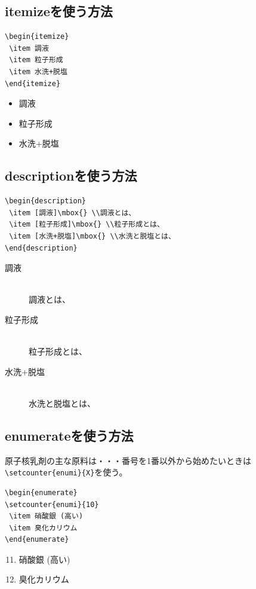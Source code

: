 \documentclass[a4j]{jsarticle}
\begin{document}
\subsection{itemizeを使う方法}
\begin{verbatim}
\begin{itemize}
 \item 調液
 \item 粒子形成
 \item 水洗+脱塩
\end{itemize}
\end{verbatim}

\begin{itemize}
 \item 調液
 \item 粒子形成
 \item 水洗+脱塩
\end{itemize}
\subsection{descriptionを使う方法}
\begin{verbatim}
\begin{description}
 \item [調液]\mbox{} \\調液とは、
 \item [粒子形成]\mbox{} \\粒子形成とは、
 \item [水洗+脱塩]\mbox{} \\水洗と脱塩とは、
\end{description}
\end{verbatim}
\begin{description}
 \item [調液]\mbox{} \\調液とは、
 \item [粒子形成]\mbox{} \\粒子形成とは、
 \item [水洗+脱塩]\mbox{} \\水洗と脱塩とは、
\end{description}
\subsection{enumerateを使う方法}
原子核乳剤の主な原料は・・・番号を1番以外から始めたいときは\verb|\setcounter{enumi}{X}|を使う。
\begin{verbatim}
\begin{enumerate}
\setcounter{enumi}{10}
 \item 硝酸銀 (高い)
 \item 臭化カリウム
\end{enumerate}
\end{verbatim}
\begin{enumerate}
\setcounter{enumi}{10}
 \item 硝酸銀 (高い)
 \item 臭化カリウム
\end{enumerate}
\newpage
\end{document}
